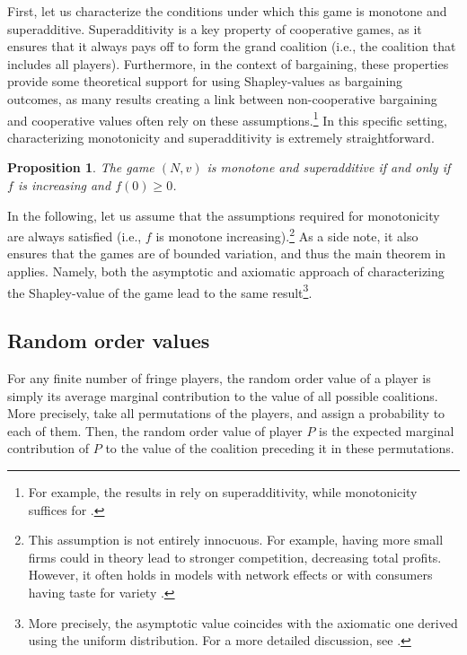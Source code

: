 \documentclass[a4paper]{article}
\newtheorem{proposition}{Proposition}
\begin{document}
First, let us characterize the conditions under which this game is monotone and superadditive.
Superadditivity is a key property of cooperative games, as it ensures that it always pays off to form the grand coalition (i.e., the coalition that includes all players).
Furthermore, in the context of bargaining, these properties provide some theoretical support for using Shapley-values as bargaining outcomes, as many results creating a link between non-cooperative bargaining and cooperative values often rely on these assumptions.\footnote{
    For example, the results in \textcite{gul1989bargaining} rely on superadditivity, while monotonicity suffices for \textcite[]{hart1996bargaining}.
}
In this specific setting, characterizing monotonicity and superadditivity is extremely straightforward.
\begin{proposition}
    \label{prop:monotone}
    The game $(N, v)$ is monotone and superadditive if and only if $f$ is increasing and $f(0) \geq 0$.
\end{proposition}

In the following, let us assume that the assumptions required for monotonicity are always satisfied (i.e., $f$ is monotone increasing).\footnote{
    This assumption is not entirely innocuous.
    For example, having more small firms could in theory lead to stronger competition, decreasing total profits.
    However, it often holds in models with network effects \parencite{rochet2003platform} or with consumers having taste for variety \parencite{anderson2020aggregative}.
}
As a side note, it also ensures that the games are of bounded variation, and thus the main theorem in \textcite{fogelman1980asymptotic} applies.
Namely, both the asymptotic and axiomatic approach of characterizing the Shapley-value of the game lead to the same result\footnote{
    More precisely, the asymptotic value coincides with the axiomatic one derived using the uniform distribution.
    For a more detailed discussion, see \textcite{fogelman1980asymptotic}.
}.

\subsection{Random order values}

For any finite number of fringe players, the random order value of a player \parencite{weber1988probabilistic} is simply its average marginal contribution to the value of all possible coalitions.
More precisely, take all permutations of the players, and assign a probability to each of them.
Then, the random order value of player $P$ is the expected marginal contribution of $P$ to the value of the coalition preceding it in these permutations.
\end{document}

